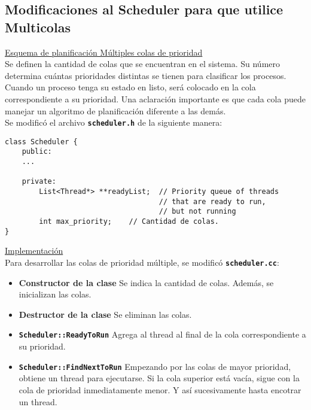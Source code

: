 \subsection*{Modificaciones al Scheduler para que utilice Multicolas}
\textsf{\underline{Esquema de planificación Múltiples colas de prioridad}}\\
Se definen la cantidad de colas que se encuentran en el sistema. Su número determina cuántas prioridades distintas se tienen para clasificar los procesos.\\
Cuando un proceso tenga su estado en listo, será colocado en la cola correspondiente a su prioridad. Una aclaración importante es que cada cola puede manejar un algoritmo de planificación diferente a las demás.\\
Se modificó el archivo \textbf{\texttt{scheduler.h}} de la siguiente manera:
\begin{lstlisting}
class Scheduler {
    public:
    ...
    
    private:
        List<Thread*> **readyList;  // Priority queue of threads
                                    // that are ready to run,
                                    // but not running
        int max_priority;    // Cantidad de colas.
}
\end{lstlisting}
\textsf{\underline{Implementación}}\\
Para desarrollar las colas de prioridad múltiple, se modificó \textbf{\texttt{scheduler.cc}}:
\begin{itemize}
    \item \textbf{Constructor de la clase} Se indica la cantidad de colas. Además, se inicializan las colas.
    \item \textbf{Destructor de la clase} Se eliminan las colas.
    \item \textbf{\texttt{Scheduler::ReadyToRun}} Agrega al thread al final de la cola correspondiente a su prioridad.
    \item \textbf{\texttt{Scheduler::FindNextToRun}} Empezando por las colas de mayor prioridad, obtiene un thread para ejecutarse. Si la cola superior está vacía, sigue con la cola de prioridad inmediatamente menor. Y así sucesivamente hasta encotrar un thread.
\end{itemize}
